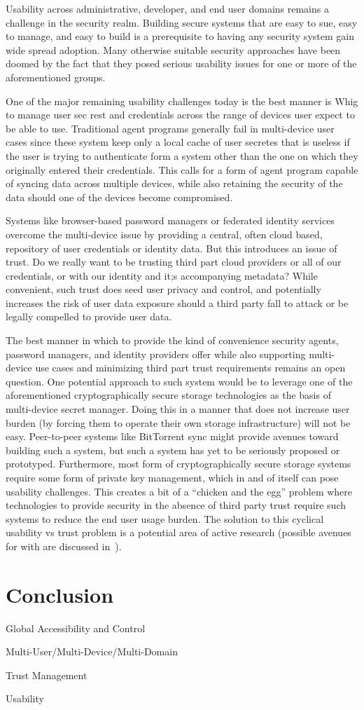 \documentclass{sig-alternate}
\begin{document}
Usability across administrative, developer, and end user domains
remains a challenge in the security realm. Building secure systems
that are easy to sue, easy to manage, and easy to build is a
prerequisite to having any security system gain wide spread
adoption. Many otherwise suitable security approaches have been doomed
by the fact that they posed serious usability issues for one or more
of the aforementioned groups.

One of the major remaining usability challenges today is the best
manner is Whig to manage user sec rest and credentials across the
range of devices user expect to be able to use. Traditional agent
programs generally fail in multi-device user cases since these system
keep only a local cache of user secretes that is useless if the user
is trying to authenticate form a system other than the one on which
they originally entered their credentials. This calls for a form of
agent program capable of syncing data across multiple devices, while
also retaining the security of the data should one of the devices
become compromised.

Systems like browser-based password managers or federated identity
services overcome the multi-device issue by providing a central, often
cloud based, repository of user credentials or identity data. But this
introduces an issue of trust. Do we really want to be trusting third
part cloud providers or all of our credentials, or with our identity
and it;s accompanying metadata? While convenient, such trust does seed
user privacy and control, and potentially increases the risk of user
data exposure should a third party fall to attack or be legally
compelled to provide user data.

The best manner in which to provide the kind of convenience security
agents, password managers, and identity providers offer while also
supporting multi-device use cases and minimizing third part trust
requirements remains an open question. One potential approach to such
system would be to leverage one of the aforementioned
cryptographically secure storage technologies as the basis of
multi-device secret manager. Doing this in a manner that does not
increase user burden (by forcing them to operate their own storage
infrastructure) will not be easy. Peer-to-peer systems like BitTorrent
sync might provide avenues toward building such a system, but such a
system has yet to be seriously proposed or prototyped. Furthermore,
most form of cryptographically secure storage systems require some
form of private key management, which in and of itself can pose
usability challenges. This creates a bit of a ``chicken and the egg''
problem where technologies to provide security in the absence of third
party trust require such systems to reduce the end user usage
burden. The solution to this cyclical usability vs trust problem is a
potential area of active research (possible avenues for with are
discussed in~\cite{custos-masters}).

\section{Conclusion}
\label{sec:conclusion}

Global Accessibility and Control

Multi-User/Multi-Device/Multi-Domain

Trust Management

Usability



\end{document}
